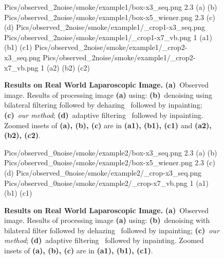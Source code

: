 \begin{figure}[!t]
     {Pics/observed_2noise/smoke/example1/box-x3_seq.png} {2.3} {(a)} {(b)}
     {Pics/observed_2noise/smoke/example1/box-x5_wiener.png} {2.3} {(c)} {(d)}
     {Pics/observed_2noise/smoke/example1/_crop1-x3_seq.png} {Pics/observed_2noise/smoke/example1/_crop1-x7_vb.png} {1} {(a1)} {(b1)} {(c1)}
     {Pics/observed_2noise/smoke/example1/_crop2-x3_seq.png} {Pics/observed_2noise/smoke/example1/_crop2-x7_vb.png} {1} {(a2)} {(b2)} {(c2)}
    \caption
    {
        {\bf Results on Real World Laparoscopic Image.}
        {\bf (a)}~Observed image.
        Results of processing image {\bf (a)} using:
        {\bf (b)}~denoising using bilateral filtering followed by dehazing~\cite{he2011dark} followed by inpainting;
        {\bf (c)}~{\em our method};
        {\bf (d)}~adaptive filtering~\cite{gibson2013wiener} followed by inpainting.
        Zoomed insets of {\bf (a), (b), (c)} are in {\bf (a1), (b1), (c1)} and {\bf (a2), (b2), (c2)}.
    }
    \label{fig:resultsObs1}
\end{figure}

\begin{figure}[!t]
     {Pics/observed_0noise/smoke/example2/box-x3_seq.png} {2.3} {(a)} {(b)}
     {Pics/observed_0noise/smoke/example2/box-x5_wiener.png} {2.3} {(c)} {(d)}
     {Pics/observed_0noise/smoke/example2/_crop-x3_seq.png} {Pics/observed_0noise/smoke/example2/_crop-x7_vb.png} {1} {(a1)} {(b1)} {(c1)}
    \caption
    {
        {\bf Results on Real World Laparoscopic Image.}
        {\bf (a)}~Observed image.
        Results of processing image {\bf (a)} using:
        {\bf (b)}~denoising with bilateral filter followed by dehazing~\cite{he2011dark} followed by inpainting;
        {\bf (c)}~{\em our method};
        {\bf (d)}~adaptive filtering~\cite{gibson2013wiener} followed by inpainting.
        Zoomed insets of {\bf (a), (b), (c)} are in {\bf (a1), (b1), (c1)}.
    }
    \label{fig:resultsObs2}
\end{figure}

